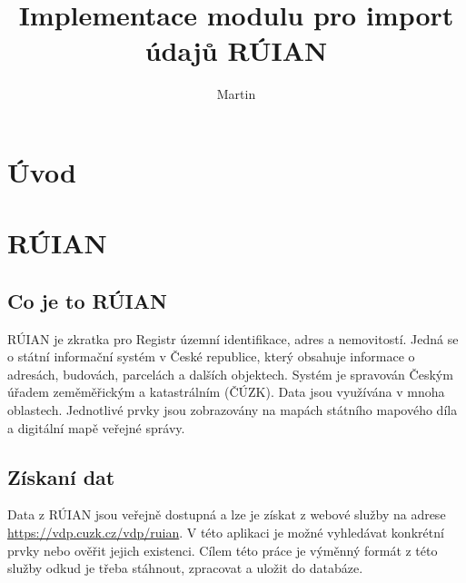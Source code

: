 \documentclass[czech, kiv, ba, he, iso690alph, pdf]{fasthesis}
\title{Implementace modulu pro import údajů RÚIAN}
\author{Martin}{Schön}{}{}
\begin{document}
\frontpages[tm]
\tableofcontents
\chapter{Úvod}

\chapter{RÚIAN}
\section{Co je to RÚIAN}
RÚIAN je zkratka pro Registr územní identifikace, adres a nemovitostí. 
Jedná se o státní informační systém v České republice, který obsahuje informace o adresách, budovách, parcelách a dalších objektech. 
Systém je spravován Českým úřadem zeměměřickým a katastrálním (ČÚZK). 
Data jsou využívána v mnoha oblastech. 
Jednotlivé prvky jsou zobrazovány na mapách státního mapového díla a digitální mapě veřejné správy.

\section{Získaní dat}
Data z RÚIAN jsou veřejně dostupná a lze je získat z webové služby na adrese \url{https://vdp.cuzk.cz/vdp/ruian}.
V této aplikaci je možné vyhledávat konkrétní prvky nebo ověřit jejich existenci.
Cílem této práce je výměnný formát z této služby odkud je třeba stáhnout, zpracovat a uložit do databáze.
\end{document}
